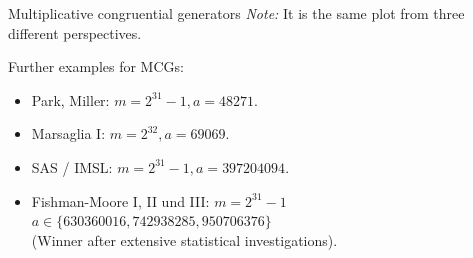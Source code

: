\documentclass[11pt,compress,t,notes=noshow, xcolor=table]{beamer}
\begin{document}
\begin{vbframe}{Multiplicative congruential generators}
{\footnotesize \emph{Note:} It is the same plot from three different perspectives.}

\framebreak

Further examples for MCGs:
\begin{itemize}
 \item Park, Miller:  $m = 2^{31} - 1, a = 48271$.
 \item Marsaglia I:  $m = 2^{32}, a = 69069$.
 \item SAS / IMSL:  $m = 2^{31} - 1, a = 397204094$.
 \item Fishman-Moore I, II und III:   $m = 2^{31} - 1$\\
 $a \in \{630360016, 742938285, 950706376 \}$ \\
 (Winner after extensive statistical investigations).
\end{itemize}
\end{vbframe}


\endlecture
\end{document}
